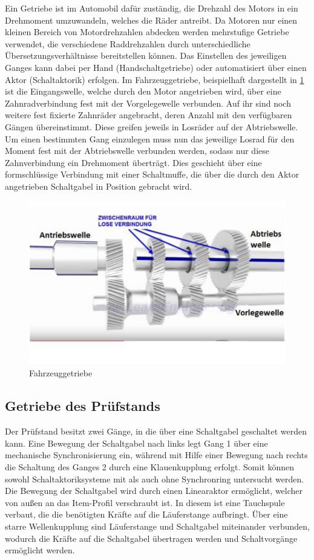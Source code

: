 Ein Getriebe ist im Automobil dafür zuständig, die Drehzahl des Motors in ein Drehmoment umzuwandeln, welches die Räder antreibt. Da Motoren nur einen kleinen Bereich von Motordrehzahlen abdecken werden mehrstufige Getriebe verwendet, die verschiedene Raddrehzahlen durch unterschiedliche Übersetzungsverhältnisse bereitstellen können.  Das Einstellen des jeweiligen Ganges kann dabei per Hand (Handschaltgetriebe) oder automatisiert über einen Aktor (Schaltaktorik) erfolgen. 
Im Fahrzeuggetriebe, beispielhaft dargestellt in \ref{fig:Fahrzeuggetriebe} ist die Eingangswelle, welche durch den Motor angetrieben wird, über eine Zahnradverbindung  fest mit der  Vorgelegewelle verbunden. Auf ihr sind noch weitere fest fixierte Zahnräder angebracht, deren Anzahl mit den verfügbaren Gängen übereinstimmt. Diese greifen jeweils in Losräder auf der Abtriebswelle. Um einen bestimmten Gang einzulegen muss nun das jeweilige Losrad für den Moment fest mit der Abtriebswelle verbunden werden, sodass nur diese Zahnverbindung ein Drehmoment überträgt. Dies geschieht über eine formschlüssige Verbindung mit einer Schaltmuffe, die über die durch den Aktor angetrieben Schaltgabel in Position gebracht wird.

\begin{figure}[h]
	\centering
		\includegraphics{Bilder/Fahrzeuggetriebe.pdf}
	\caption{Fahrzeuggetriebe}
	\label{fig:Fahrzeuggetriebe}
\end{figure}

\subsection{Getriebe des Prüfstands}

Der Prüfstand besitzt zwei Gänge, in die über eine Schaltgabel geschaltet werden kann. Eine Bewegung der Schaltgabel nach links legt Gang 1 über eine mechanische Synchronisierung ein, während mit Hilfe einer Bewegung nach rechts die Schaltung des Ganges 2 durch eine Klauenkupplung erfolgt. Somit können sowohl Schaltaktoriksysteme mit als auch ohne Synchronring untersucht werden.
Die Bewegung der Schaltgabel wird durch einen Linearaktor ermöglicht, welcher von außen an das Item-Profil verschraubt ist. In diesem ist eine Tauchspule verbaut, die die benötigten Kräfte auf die Läuferstange aufbringt. Über eine starre Wellenkupplung sind Läuferstange und Schaltgabel miteinander verbunden, wodurch die Kräfte auf die Schaltgabel übertragen werden und Schaltvorgänge ermöglicht werden.

